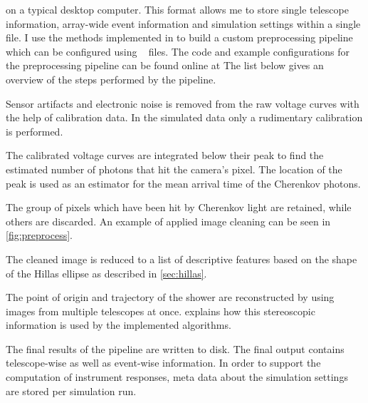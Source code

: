 on a typical desktop computer. 
This format allows me to store single telescope information, array-wide event information and simulation settings within a single file.
I use the methods implemented in \ctapipe to build a custom preprocessing pipeline which can be configured using \yaml~\cite{yaml} files. 
The code and example configurations for the preprocessing pipeline can be found online at 
The list below gives an overview of the steps performed by the pipeline.
\begin{description}[style=nextline, leftmargin=0em, parsep=0.1em, itemsep=0.2em, labelindent=0em]
    \item[Raw Data Calibration] Sensor artifacts and electronic noise is removed from the raw voltage curves with the help of calibration data.
    In the simulated data only a rudimentary calibration is performed.
    \item[Integration] The calibrated voltage curves are integrated below their peak to find the estimated number of photons that hit the camera's pixel. The location of the peak 
    is used as an estimator for the mean arrival time of the Cherenkov photons. 
    \item[Image Cleaning] The group of pixels which have been hit by Cherenkov light are retained, while others are discarded. An example 
    of applied image cleaning can be seen in \cref{fig:preprocess}. 
    \item[Image Parametrization] The cleaned image is reduced to a list of descriptive features based on the shape of the Hillas ellipse as described in \cref{sec:hillas}. 
    \item[Shower Reconstruction] The point of origin and trajectory of the shower are reconstructed by using images from multiple 
    telescopes at once.  explains how this stereoscopic information is used by the implemented algorithms.
    \item[Output] The final results of the pipeline are written to disk. The final output contains telescope-wise as well as event-wise information.
    In order to support the computation of instrument responses, meta data about the simulation settings are stored per simulation run.  
\end{description}


